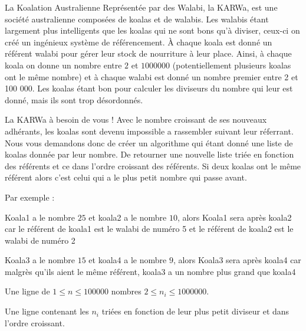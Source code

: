 \problemname{\problemyamlname}

La Koalation Australienne Représentée par des Walabi, la KARWa, est une société australienne
composées de koalas et de walabis. Les walabis étant largement plus intelligents que les koalas qui ne sont bons qu'à diviser,
ceux-ci on créé un ingénieux système de référencement. À chaque koala est donné un référent walabi pour gérer leur stock de nourriture à leur place.
Ainsi, à chaque koala on donne un nombre entre $2$ et $1 000 000$ (potentiellement plusieurs koalas ont le même nombre) et à chaque walabi est donné un nombre premier entre 2 et 100 000.
Les koalas étant bon pour calculer les diviseurs du nombre qui leur est donné, mais ils sont trop désordonnés.

La KARWa à besoin de vous ! Avec le nombre croissant de ses nouveaux adhérants, les koalas sont devenu impossible a rassembler suivant leur réferrant.
Nous vous demandons donc de créer un algorithme qui étant donné une liste de koalas donnée par leur nombre. De retourner une nouvelle liste
triée en fonction des référents et ce dans l'ordre croissant des référents.
Si deux koalas ont le même référent alors c'est celui qui a le plus petit nombre qui passe avant.

Par exemple :

Koala1 a le nombre $25$ et koala2 a le nombre $10$,
alors Koala1 sera après koala2 car le référent de koala1 est le walabi de numéro 5 et le référent de koala2 est le walabi de numéro 2

Koala3 a le nombre $15$ et koala4 a le nombre $9$,
alors Koala3 sera après koala4 car malgrès qu'ils aient le même référent, koala3 a un nombre plus grand que koala4

\begin{Input}
	Une ligne de $1 \leq n \leq 100 000$ nombres $2 \leq n_i \leq 1 000 000$.
\end{Input}

\begin{Output}
	Une ligne contenant les $n_i$ triées en fonction de leur plus petit diviseur et dans l'ordre croissant.
\end{Output}
